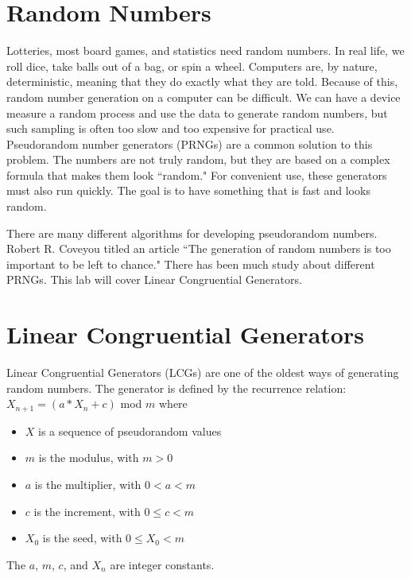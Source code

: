 \label{lab:PRNG}


\section*{Random Numbers}
Lotteries, most board games, and statistics need random numbers.
In real life, we roll dice, take balls out of a bag, or spin a wheel.
Computers are, by nature, deterministic, meaning that they do exactly what they are told.
Because of this, random number generation on a computer can be difficult.
We can have a device measure a random process and use the data to generate random numbers, 
but such sampling is often too slow and too expensive for practical use.
Pseudorandom number generators (PRNGs) are a common solution to this problem.
The numbers are not truly random, but they are based on a complex formula that makes them look ``random."
For convenient use, these generators must also run quickly.
The goal is to have something that is fast and looks random.

There are many different algorithms for developing pseudorandom numbers.
Robert R. Coveyou titled an article ``The generation of random numbers is too important to be left to chance."
There has been much study about different PRNGs.
This lab will cover Linear Congruential Generators.

\section*{Linear Congruential Generators}
Linear Congruential Generators (LCGs) are one of the oldest ways of generating random numbers.
The generator is defined by the recurrence relation:
$X_{n+1}=(a*X_n + c)$ mod $m$ where

\begin{itemize}
\item $X$ is a sequence of pseudorandom values
\item $m$ is the modulus, with $m>0$
\item $a$ is the multiplier, with $0<a<m$
\item $c$ is the increment, with $0\leq c<m$
\item $X_0$ is the seed, with $0\leq X_0 <m$
\end{itemize}

The $a$, $m$, $c$, and $X_n$ are integer constants.


